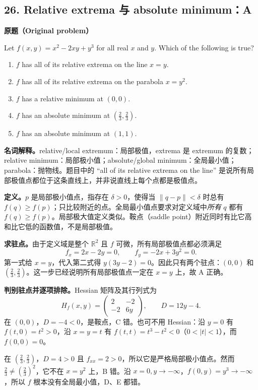 \documentclass[11pt,a4paper,fontset=fandol]{ctexart}
\begin{document}
\subsection{26. Relative extrema 与 absolute minimum：A}
\label{p2:q26}
\textbf{原题（Original problem）}

Let $f(x,y)=x^2-2xy+y^3$ for all real $x$ and $y$. Which of the following is true?
\begin{enumerate}[label=(\Alph*)]
\item $f$ has all of its relative extrema on the line $x=y$.
\item $f$ has all of its relative extrema on the parabola $x=y^2$.
\item $f$ has a relative minimum at $(0,0)$.
\item $f$ has an absolute minimum at $\left(\frac23,\frac23\right)$.
\item $f$ has an absolute minimum at $(1,1)$.
\end{enumerate}
\textbf{名词解释。}relative/local extremum：局部极值，extrema 是 extremum 的复数；relative minimum：局部极小值；absolute/global minimum：全局最小值；parabola：抛物线。题目中的 ``all of its relative extrema on the line'' 是说所有局部极值点都位于这条直线上，并非说直线上每个点都是极值点。

\textbf{定义。}$p$ 是局部极小值点，指存在 $\delta>0$，使得当 $\|q-p\|<\delta$ 时总有 $f(q)\ge f(p)$；只比较附近的点。全局最小值点要求对定义域中\emph{所有} $q$ 都有 $f(q)\ge f(p)$。局部极大值定义类似。鞍点（saddle point）附近同时有比它高和比它低的函数值，不是局部极值。

\textbf{求驻点。}由于定义域是整个 $\mathbb R^2$ 且 $f$ 可微，所有局部极值点都必须满足
\[
f_x=2x-2y=0,\qquad f_y=-2x+3y^2=0.
\]
第一式给 $x=y$，代入第二式得 $y(3y-2)=0$。因此只有两个驻点：$(0,0)$ 和 $(\frac23,\frac23)$。这一步已经说明所有局部极值点一定在 $x=y$ 上，故 A 正确。

\textbf{判别驻点并逐项排除。}Hessian 矩阵及其行列式为
\[
H_f(x,y)=\begin{pmatrix}2&-2\\-2&6y\end{pmatrix},\qquad D=12y-4.
\]
在 $(0,0)$，$D=-4<0$，是鞍点，C 错。也可不用 Hessian：沿 $y=0$ 有 $f(t,0)=t^2>0$，沿 $x=y=t$ 有 $f(t,t)=t^3-t^2<0$（$0<|t|<1$），而 $f(0,0)=0$。

在 $(\frac23,\frac23)$，$D=4>0$ 且 $f_{xx}=2>0$，所以它是严格局部极小值点。然而 $\frac23\ne(\frac23)^2$，它不在 $x=y^2$ 上，B 错。沿 $x=0,y\to-\infty$，$f(0,y)=y^3\to-\infty$，所以 $f$ 根本没有全局最小值，D、E 都错。
\end{document}
